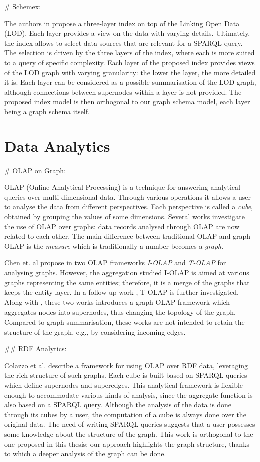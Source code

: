 \# Schemex:

The authors in \cite{konrath:jws:2012} propose a three-layer index on top of the Linking Open Data (LOD). Each layer provides a view on the data with varying details. Ultimately, the index allows to select data sources that are relevant for a SPARQL query. The selection is driven by the three layers of the index, where each is more suited to a query of specific complexity.
Each layer of the proposed index provides views of the LOD graph with varying granularity: the lower the layer, the more detailed it is. Each layer can be considered as a possible summarisation of the LOD graph, although connections between supernodes within a layer is not provided. The proposed index model is then orthogonal to our graph schema model, each layer being a graph schema itself.

\section{Data Analytics}

\# OLAP on Graph:

OLAP (Online Analytical Processing) is a technique for answering analytical queries over multi-dimensional data. Through various operations it allows a user to analyse the data from different perspectives. Each perspective is called a \emph{cube}, obtained by grouping the values of some dimensions. Several works investigate the use of OLAP over graphs: data records analysed through OLAP are now related to each other. The main difference between traditional OLAP and graph OLAP is the \emph{measure} which is traditionally a number becomes a \emph{graph}.

Chen et. al propose in \cite{chen:icdm:2008} two OLAP frameworks \emph{I-OLAP} and \emph{T-OLAP} for analysing graphs. However, the aggregation studied I-OLAP is aimed at various graphs representing the same entities; therefore, it is a merge of the graphs that keeps the entity layer. In a follow-up work \cite{qu:dasfaa:2011}, T-OLAP is further investigated. Along with \cite{zhao:sigmod:2011}, these two works introduces a graph OLAP framework which aggregates nodes into supernodes, thus changing the topology of the graph. Compared to graph summarisation, these works are not intended to retain the structure of the graph, e.g., by considering incoming edges.

\#\# RDF Analytics:

Colazzo et al. \cite{colazzo:www:2014} describe a framework for using OLAP over RDF data, leveraging the rich structure of such graphs. Each cube is built based on SPARQL queries which define supernodes and superedges. This analytical framework is flexible enough to accommodate various kinds of analysis, since the aggregate function is also based on a SPARQL query. Although the analysis of the data is done through its cubes by a user, the computation of a cube is always done over the original data. The need of writing SPARQL queries suggests that a user possesses some knowledge about the structure of the graph. This work is orthogonal to the one proposed in this thesis: our approach highlights the graph structure, thanks to which a deeper analysis of the graph can be done.

